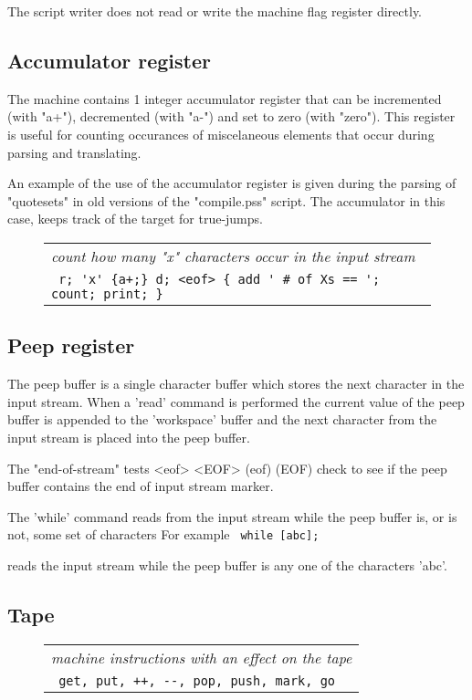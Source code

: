 \documentclass[a4paper,12pt]{article}
\begin{document}
  The script writer does not read or write the machine flag register
  directly.

\subsection{Accumulator register}

  The machine contains 1 integer accumulator register that can
  be incremented (with "a+"), decremented (with "a-") and set to
  zero (with "zero"). This register is useful for counting occurances
  of miscelaneous elements that occur during parsing and translating.

  An example of the use of the accumulator register is given during the
  parsing of "quotesets" in old versions of the "compile.pss" script. The
  accumulator in this case, keeps track of the target for true-jumps.
 \begin{figure}
 \begin{tabular}{ l }
 \emph{ count how many "x" characters occur in the input stream } \\ 
 \verb| r; 'x' {a+;} d; <eof> { add ' # of Xs == '; count; print; } |
 \end{tabular} 
 \end{figure}
  
\subsection{Peep register}

  The peep buffer is a single character buffer which stores
  the next character in the input stream. When a 'read' command
  is performed the current value of the peep buffer is appended to
  the 'workspace' buffer and the next character from the input
  stream is placed into the peep buffer.

  The "end-of-stream" tests <eof> <EOF> (eof) (EOF) check to see if the peep
  buffer contains the end of input stream marker.

  The 'while' command reads from the input stream while the
  peep buffer is, or is not, some set of characters
  For example 
 \verb| while [abc]; |

  reads the input stream while the peep buffer is any one of the
  characters 'abc'.

\subsection{Tape}
 \begin{figure}
 \begin{tabular}{ l }
 \emph{ machine instructions with an effect on the tape } \\ 
 \verb| get, put, ++, --, pop, push, mark, go |
 \end{tabular} 
 \end{figure}
\end{document}
